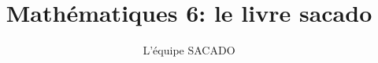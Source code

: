 





\title{Mathématiques 6\ieme : le livre sacado}
\author{L'équipe SACADO}



\maketitle

%
%
%
%
%
%
%
%
%
%
%
%
%
%
